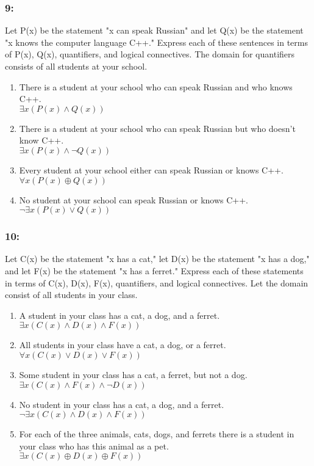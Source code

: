 \documentclass[12pt,en,a4paper]{report}
\begin{document}
	\subsubsection*{9:}
	Let P(x) be the statement "x can speak Russian" and let Q(x) be the statement "x knows the computer language C++." Express each of these sentences in terms of P(x), Q(x), quantifiers, and logical connectives. The domain for quantifiers consists of all students at your school.
	\begin{enumerate}[label=\textbf{\alph*)}]
		\item There is a student at your school who can speak Russian and who knows C++.\\
		$\exists x (P(x) \wedge Q(x))$
		\item There is a student at your school who can speak Russian but who doesn't know C++.\\
		$\exists x (P(x) \wedge \neg Q(x))$\\
		\item Every student at your school either can speak Russian or knows C++.\\
		$\forall x (P(x) \oplus Q(x))$
		\item No student at your school can speak Russian or knows C++.\\
		$\neg \exists x (P(x) \vee Q(x))$
	\end{enumerate}
	\subsubsection*{10:}
	Let C(x) be the statement "x has a cat," let D(x) be the statement "x has a dog," and let F(x) be the statement "x has a ferret." Express each of these statements in terms of C(x), D(x), F(x), quantifiers, and logical connectives. Let the domain consist of all students in your class.
	\begin{enumerate}[label=\textbf{\alph*)}]
		\item A student in your class has a cat, a dog, and a ferret.\\
		$\exists x (C(x) \wedge D(x) \wedge F(x))$
		\item All students in your class have a cat, a dog, or a ferret.\\
		$\forall x (C(x) \vee D(x) \vee F(x))$
		\item Some student in your class has a cat, a ferret, but not a dog.\\
		$\exists x (C(x) \wedge F(x) \wedge \neg D(x))$
		\item No student in your class has a cat, a dog, and a ferret.\\
		$\neg \exists x (C(x) \wedge D(x) \wedge F(x))$
		\item For each of the three animals, cats, dogs, and ferrets there is a student in your class who has this animal as a pet.\\
		$\exists x (C(x) \oplus D(x) \oplus F(x))$
	\end{enumerate}
\end{document}
